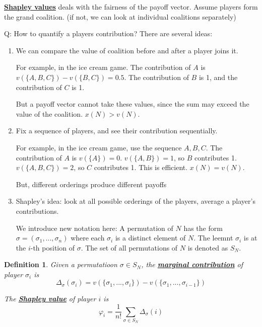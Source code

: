 \documentclass[twoside]{article}
\newtheorem{protodefinition}[prototheorem]{Definition}
\newenvironment{definition}
{\colorlet{shadecolor}{cyan!15}\begin{shaded}\begin{protodefinition}\normalfont}
		{\end{protodefinition}\end{shaded}}
\begin{document}
\textbf{\underline{Shapley values}} deals with the fairness of the payoff vector. Assume players form the grand coalition. (if not, we can look at individual coalitions separately)

Q: How to quantify a players contribution? There are several ideas: \begin{enumerate}
\item We can compare the value of coalition before and after a player joins it. 
	
For example, in the ice cream game. The contribution of $A$ is $v(\{A, B, C\}) - v(\{B, C\}) = 0.5$. The contribution of $B$ is 1, and the contribution of $C$ is 1. 
	
But a payoff vector cannot take these values, since the sum may exceed the value of the coalition. $x(N) > v(N)$. 
	
\item Fix a sequence of players, and see their contribution sequentially. 
	
For example, in the ice cream game, use the sequence $A, B, C$. The contribution of $A$ is $v(\{A\}) = 0$. $v(\{A, B\}) = 1$, so $B$ contributes 1. $v(\{A, B, C\}) = 2$, so $C$ contributes 1. This is efficient. $x(N) = v(N)$. 
	
But, different orderings produce different payoffs
	
\item Shapley's idea: look at all possible orderings of the players, average a player's contributions.
	
We introduce new notation here: A permutation of $N$ has the form $\sigma = (\sigma_1, ..., \sigma_n)$ where each $\sigma_i$ is a distinct element of $N$. The leemnt $\sigma_i$ is at the $i$-th position of $\sigma$. The set of all permutations of $N$ is denoted as $S_N$. 
\end{enumerate}

\begin{definition}
	Given a permutatioon $\sigma \in S_N$, the \textbf{\underline{marginal contribution}} of player $\sigma_i$ is $$\Delta_\sigma(\sigma_i) = v(\{\sigma_1, ..., \sigma_i\}) - v(\{\sigma_1, ..., \sigma_{i-1}\})$$
		
	The \textbf{\underline{Shapley value}} of player $i$ is $$\varphi_i = \frac{1}{n!}\sum_{\sigma \in S_N} \Delta_\sigma(i)$$
\end{definition}
\end{document}
